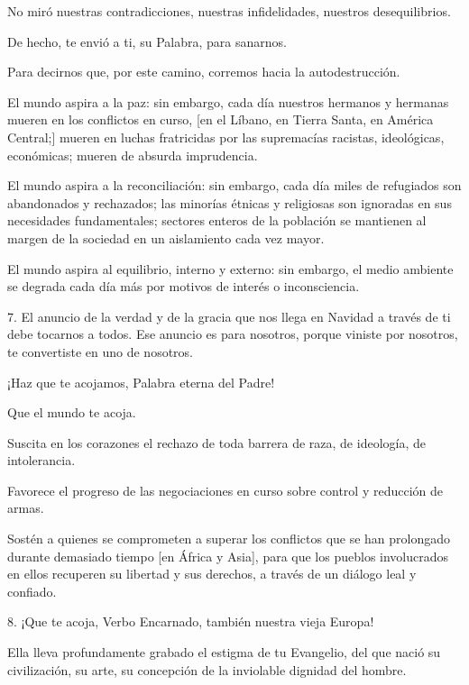 \begin{body}
							No miró nuestras contradicciones, nuestras infidelidades, nuestros desequilibrios.
							
							De hecho, te envió a ti, su Palabra, para sanarnos.
							
							Para decirnos que, por este camino, corremos hacia la autodestrucción.
							
							El mundo aspira a la paz: sin embargo, cada día nuestros hermanos y hermanas mueren en los conflictos en curso, {[}en el Líbano, en Tierra Santa, en América Central;{]} mueren en luchas fratricidas por las supremacías racistas, ideológicas, económicas; mueren de absurda imprudencia.
							
							El mundo aspira a la reconciliación: sin embargo, cada día miles de refugiados son abandonados y rechazados; las minorías étnicas y religiosas son ignoradas en sus necesidades fundamentales; sectores enteros de la población se mantienen al margen de la sociedad en un aislamiento cada vez mayor.
							
							El mundo aspira al equilibrio, interno y externo: sin embargo, el medio ambiente se degrada cada día más por motivos de interés o inconsciencia.
							
							7. El anuncio de la verdad y de la gracia que nos llega en Navidad a través de ti debe tocarnos a todos. Ese anuncio es para nosotros, porque viniste por nosotros, te convertiste en uno de nosotros.
							
							¡Haz que te acojamos, Palabra eterna del Padre!
							
							Que el mundo te acoja.
							
							Suscita en los corazones el rechazo de toda barrera de raza, de ideología, de intolerancia.
							
							Favorece el progreso de las negociaciones en curso sobre control y reducción de armas.
							
							Sostén a quienes se comprometen a superar los conflictos que se han prolongado durante demasiado tiempo {[}en África y Asia{]}, para que los pueblos involucrados en ellos recuperen su libertad y sus derechos, a través de un diálogo leal y confiado.
							
							8. ¡Que te acoja, Verbo Encarnado, también nuestra vieja Europa!
							
							Ella lleva profundamente grabado el estigma de tu Evangelio, del que nació su civilización, su arte, su concepción de la inviolable dignidad del hombre.
							

\end{body}
